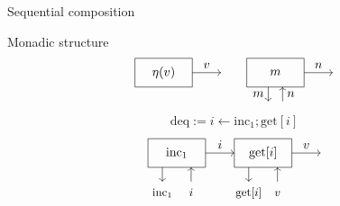\documentclass[aspectratio=141]{beamer}
\newcommand{\kw}[1]{\ensuremath{ \mathrm{#1} }}
\begin{document}
\begin{frame}[fragile]{Sequential composition}
\begin{block}{Monadic structure}
\[    %
    \begin{tikzpicture}[scale=0.4,baseline=0]
      \draw (-2,-1) rectangle (2,1);
      \draw[->] (2,0) -- node[above] {$v$} (4,0);
      \node (L) at (0,0) {$\eta(v)$};
    \end{tikzpicture}
    \qquad
    \begin{tikzpicture}[scale=0.4,baseline=0]
      \draw (-2,-1) rectangle (2,1);
      \draw[->] (2,0) -- node[above] {$n$} (4,0);
      \node (L) at (0,0) {$m$};
      \draw[->] (-0.5, -1) -- node[left]  {$m$} (-0.5, -2);
      \draw[->] ( 0.5, -2) -- node[right] {$n$} ( 0.5, -1);
    \end{tikzpicture}
  \]
\end{block}

\begin{example}
  \[
    \kw{deq} :=
      i \leftarrow \kw{inc}_1 \mathrel{;} \kw{get}[i]
  \]
  \[
    \begin{tikzpicture}[scale=0.4]
      \begin{scope}[xshift=-6cm]
        \draw (-2,-1) rectangle (2,1);
        \node (L) at (0,0) {$\kw{inc}_1$};
        \draw[->] (-1, -1) -- (-1, -2);
        \node[anchor=base] at (-1,-3) {\small $\kw{inc_1}$};
        \draw[->] (1, -2) -- (1, -1);
        \node[anchor=base] at (1,-3) {\small $i$};
        \draw[->] (2,0) -- node[above] {$i$} (4,0);
      \end{scope}
      \begin{scope}
        \draw (-2,-1) rectangle (2,1);
        \node (L) at (0,0) {$\kw{get}[i]$};
        \draw[->] (-1, -1) -- (-1, -2);
        \node[anchor=base] at (-1, -3) {\small $\kw{get}[i]$};
        \draw[->] (1, -2) -- (1, -1);
        \node[anchor=base] at (1, -3) {\small $v$};
        \draw[->] (2,0) -- node[above] {$v$} (4,0);
      \end{scope}
    \end{tikzpicture}%
  \]
\end{example}
\end{frame}
\end{document}
